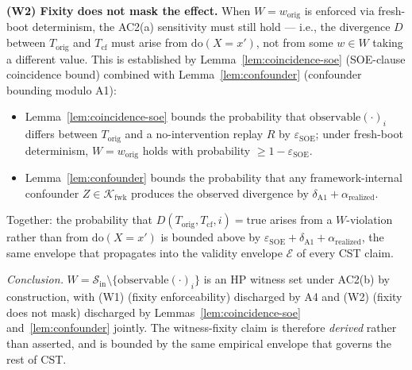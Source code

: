 \documentclass[conference]{IEEEtran}
\newcommand{\Korig}{T_\text{orig}}
\newcommand{\Tcf}{T_\text{cf}}
\newcommand{\Kfwk}{\mathcal{K}_\text{fwk}}
\newcommand{\arealized}{\alpha_\text{realized}}
\newcommand{\dox}[1]{\text{do}(X{=}#1)}
\newcommand{\epsSOE}{\varepsilon_\text{SOE}}
\begin{document}
\textbf{(W2) Fixity does not mask the effect.} When
$W = w_{\text{orig}}$ is enforced via fresh-boot determinism, the
AC2(a) sensitivity must still hold --- i.e., the divergence $D$
between $\Korig$ and $\Tcf$ must arise from $\dox{x'}$, not from
some $w \in W$ taking a different value. This is established by
Lemma~\ref{lem:coincidence-soe} (SOE-clause coincidence bound)
combined with Lemma~\ref{lem:confounder} (confounder bounding
modulo A1):
\begin{itemize}[leftmargin=*]
  \item Lemma~\ref{lem:coincidence-soe} bounds the probability
    that $\text{observable}(\cdot)_i$ differs between $\Korig$
    and a no-intervention replay $R$ by $\epsSOE$; under
    fresh-boot determinism, $W = w_{\text{orig}}$ holds with
    probability $\geq 1 - \epsSOE$.
  \item Lemma~\ref{lem:confounder} bounds the probability that
    any framework-internal confounder $Z \in \Kfwk$ produces the
    observed divergence by $\delta_{\text{A1}} + \arealized$.
\end{itemize}
Together: the probability that $D(\Korig, \Tcf, i) = \text{true}$
arises from a $W$-violation rather than from $\dox{x'}$ is bounded
above by $\epsSOE + \delta_{\text{A1}} + \arealized$, the same
envelope that propagates into the validity envelope $\mathcal{E}$
of every CST claim.

\emph{Conclusion.}
$W = \mathcal{S}_\text{in} \setminus \{\text{observable}(\cdot)_i\}$
is an HP witness set under AC2(b) by construction, with (W1)
(fixity enforceability) discharged by A4 and (W2)
(fixity does not mask) discharged by
Lemmas~\ref{lem:coincidence-soe} and~\ref{lem:confounder}
jointly. The witness-fixity claim is therefore \emph{derived}
rather than asserted, and is bounded by the same empirical
envelope that governs the rest of CST.
\end{document}
